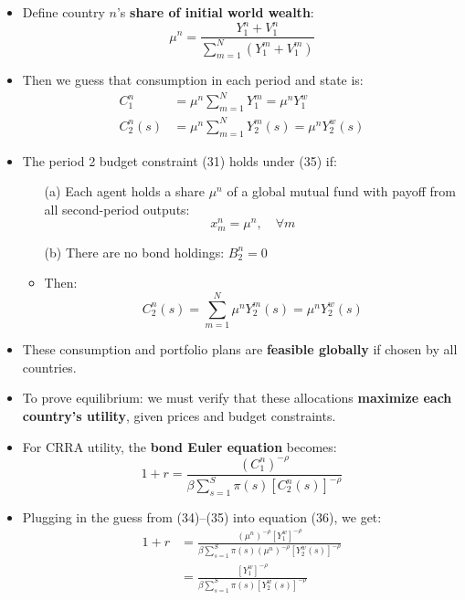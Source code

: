 \documentclass[12pt]{article}
\begin{document}
\begin{itemize}
\begin{itemize}
    \item Define country \( n \)'s \textbf{share of initial world wealth}:
    \[
    \mu^n = \frac{Y_1^n + V_1^n}{\sum_{m=1}^{N}(Y_1^m + V_1^m)} \tag{33}
    \]

    \item Then we guess that consumption in each period and state is:
    \begin{align}
        C_1^n &= \mu^n \sum_{m=1}^{N} Y_1^m = \mu^n Y_1^w \tag{34} \\
        C_2^n(s) &= \mu^n \sum_{m=1}^{N} Y_2^m(s) = \mu^n Y_2^w(s) \tag{35}
    \end{align}
\end{itemize}

\begin{itemize}
    \item The period 2 budget constraint (31) holds under (35) if:
    \begin{itemize}
        \item[(a)] Each agent holds a share \( \mu^n \) of a global mutual fund with payoff from all second-period outputs:
        \[
        x_m^n = \mu^n, \quad \forall m
        \]

        \item[(b)] There are no bond holdings: \( B_2^n = 0 \)

        \item Then:
        \[
        C_2^n(s) = \sum_{m=1}^{N} \mu^n Y_2^m(s) = \mu^n Y_2^w(s)
        \]
    \end{itemize}

    \item These consumption and portfolio plans are \textbf{feasible globally} if chosen by all countries.

    \item To prove equilibrium: we must verify that these allocations \textbf{maximize each country’s utility}, given prices and budget constraints.

    \item For CRRA utility, the \textbf{bond Euler equation} becomes:
    \[
    1 + r = \frac{(C_1^n)^{-\rho}}{\beta \sum_{s=1}^{S} \pi(s) [C_2^n(s)]^{-\rho}} \tag{36}
    \]
\end{itemize}

\begin{itemize}
    \item Plugging in the guess from (34)–(35) into equation (36), we get:
    \begin{align*}
        1 + r &= \frac{(\mu^n)^{-\rho} [Y_1^w]^{-\rho}}{\beta \sum_{s=1}^{S} \pi(s)(\mu^n)^{-\rho}[Y_2^w(s)]^{-\rho}} \\
        &= \frac{[Y_1^w]^{-\rho}}{\beta \sum_{s=1}^{S} \pi(s)[Y_2^w(s)]^{-\rho}} \tag{37}
    \end{align*}


\end{itemize}
\end{itemize}
\end{document}
